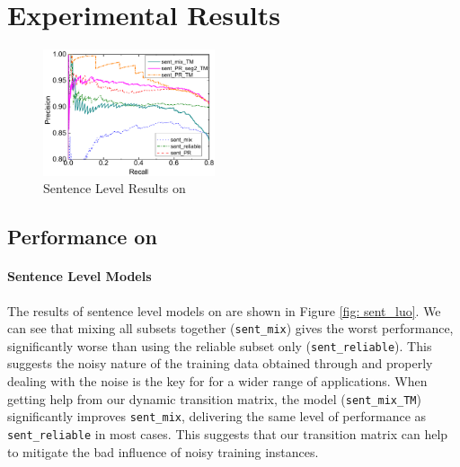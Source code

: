 \section{Experimental Results \label{sec:evaluation}}

\begin{figure}[t!]
\setlength{\belowcaptionskip}{-10pt}
\begin{center}
\includegraphics[width=0.45\textwidth]{figures/sent_time_exp_overall.pdf}
\caption{Sentence Level Results on \TimeRE}
\label{fig: sent_luo}
\end{center}
\end{figure}


\subsection{Performance on \TimeRE} \label{sec:results_in_TimeRE}

\paragraph{Sentence Level Models}
The results of sentence level models on \TimeRE are shown in Figure \ref{fig:
sent_luo}. We can see that mixing all subsets together (\texttt{sent\_mix})
gives the worst performance,  significantly
worse than using the reliable subset only (\texttt{sent\_reliable}). This
suggests the noisy nature of the training data obtained through \DS and
properly dealing with the noise is the key for \DS for a wider range of applications. %
When getting help from our dynamic transition matrix, %
the model (\texttt{sent\_mix\_TM}) significantly improves \texttt{sent\_mix},
delivering the same level of performance as \texttt{sent\_reliable} in most
cases. This suggests that our transition matrix can help to mitigate the bad influence of noisy training instances.


